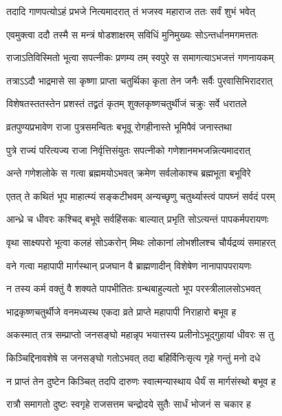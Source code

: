 \twolineshloka
{तदादि गाणपत्योऽहं प्रभजे नित्यमादरात्}
{तं भजस्व महाराज ततः सर्वं शुभं भवेत्} %

\twolineshloka
{एवमुक्त्वा ददौ तस्मै स मन्त्रं षोडशाक्षरम्}
{सविधिं मुनिमुख्यः सोऽन्तर्धानमगमत्ततः} %

\twolineshloka
{राजाऽतिविस्मितो भूत्वा सपत्नीकः प्रणम्य तम्}
{स्वपुरे स समागत्याऽभजत्तं गणनायकम्} %

\twolineshloka
{तत्राऽऽदौ भाद्रमासे सा कृष्णा प्राप्ता चतुर्थिका}
{कृता तेन जनैः सर्वैः पुरवासिभिरादरात्} %

\twolineshloka
{विशेषतस्ततस्तेन प्रशस्तं तद्व्रतं कृतम्}
{शुक्लकृष्णचतुर्थीजं चक्रुः सर्वे धरातले} %

\twolineshloka
{व्रतपुण्यप्रभावेण राजा पुत्रसमन्वितः}
{बभूवू रोगहीनास्ते भूमिपैवं जनास्तथा} %

\twolineshloka
{पुत्रे राज्यं परित्यज्य राजा निर्वृत्तिसंयुतः}
{सपत्नीको गणेशानमभजन्नित्यमादरात्} %

\twolineshloka
{अन्ते गणेशलोके स गत्वा ब्रह्ममयोऽभवत्}
{क्रमेण सर्वलोकाश्च ब्रह्मभूता बभूविरे} %

\twolineshloka
{एतत् ते कथितं भूप माहात्म्यं सङ्कटीभवम्}
{अन्यच्छृणु चतुर्थ्यास्त्वं पापघ्नं सर्वदं परम्} %

\twolineshloka
{आन्ध्रे च धीवरः कश्चिद् बभूवे सर्वहिंसकः}
{बाल्यात् प्रभृति सोऽत्यन्तं पापकर्मपरायणः} %

\twolineshloka
{वृथा साक्ष्यपरो भूत्वा कलहं सोऽकरोन् मिथः}
{लोकानां लोभशीलश्च चौर्यद्रव्यं समाहरत्} %

\twolineshloka
{वने गत्वा महापापी मार्गस्थान् प्रजघान वै}
{ब्राह्मणादीन् विशेषेण नानापापपरायणः} %

\twolineshloka
{न तस्य कर्म वक्तुं वै शक्यते पापभीतितः}
{ग्रन्थबाहुल्यतो भूप परस्त्रीलालसोऽभवत्} %

\twolineshloka
{भाद्रकृष्णचतुर्थीजे वनमध्यस्थ एकदा}
{व्रते प्राप्ते महापापी निराहारो बभूव ह} %

\twolineshloka
{अकस्मात् तत्र सम्प्राप्तो जनसङ्घो महान्नृप}
{भयात्तस्य प्रलीनोऽभूद्गुहायां धीवरः स तु} %

\twolineshloka
{किञ्चिद्दिनावशेषे स जनसङ्घो गतोऽभवत्}
{तदा बहिर्विनिःसृत्य गृहे गन्तुं मनो दधे} %

\twolineshloka
{न प्राप्तं तेन दुष्टेन किञ्चित् तदपि दारुणः}
{स्वात्मन्यास्थाय धैर्यं स मार्गसंस्थो बभूव ह} %

\twolineshloka
{रात्रौ समागतो दुष्टः स्वगृहे राजसत्तम}
{चन्द्रोदये सुतैः सार्धं भोजनं स चकार ह} %

